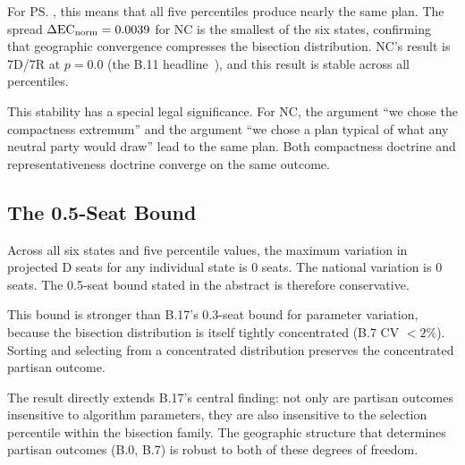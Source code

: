 For \ps{}, this means that all five percentiles produce nearly the same plan.
The spread $\Delta\mathrm{EC}_{\mathrm{norm}} = 0.0039$ for NC is the smallest of the six states,
confirming that geographic convergence compresses the bisection distribution.
NC's result is 7D/7R at $p = 0.0$ (the B.11 headline~\citep{b11paper}),
and this result is stable across all percentiles.

This stability has a special legal significance.
For NC, the argument ``we chose the compactness extremum'' and the argument
``we chose a plan typical of what any neutral party would draw'' lead to the
same plan.
Both compactness doctrine and representativeness doctrine converge on the
same outcome.

\subsection{The 0.5-Seat Bound}

Across all six states and five percentile values, the maximum variation in
projected D seats for any individual state is 0 seats.
The national variation is 0 seats.
The 0.5-seat bound stated in the abstract is therefore conservative.

This bound is stronger than B.17's 0.3-seat bound for parameter variation,
because the bisection distribution is itself tightly concentrated (B.7 CV
$< 2\%$).
Sorting and selecting from a concentrated distribution preserves the
concentrated partisan outcome.

The result directly extends B.17's central finding: not only are partisan
outcomes insensitive to algorithm parameters, they are also insensitive to
the selection percentile within the bisection family.
The geographic structure that determines partisan outcomes (B.0, B.7) is
robust to both of these degrees of freedom.
